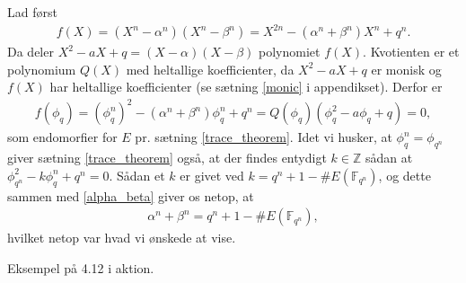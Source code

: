 \begin{proofof}
Lad først
\begin{align*}
	f(X) = (X^n - \alpha^n)(X^n - \beta^n) = X^{2n} - (\alpha^n + \beta^n)X^n + q^n.
\end{align*}
Da deler $X^2 - aX + q = (X- \alpha)(X-\beta)$ polynomiet $f(X)$. Kvotienten er et polynomium $Q(X)$ med heltallige koefficienter, da $X^2 - aX + q$ er monisk og $f(X)$ har heltallige koefficienter (se sætning \ref{monic} i appendikset). Derfor er
\begin{align}
	\label{alpha_beta}
	f(\phi_q) = (\phi_{q}^{n})^2 - (\alpha^n + \beta^n) \phi_{q}^{n} + q^n
	= Q(\phi_q)(\phi_{q}^{2} - a \phi_q + q) = 0,
\end{align}
som endomorfier for $E$ pr. sætning \ref{trace_theorem}. Idet vi husker, at $\phi_{q}^{n} = \phi_{q^n}$ giver sætning \ref{trace_theorem} også, at der findes entydigt $k \in \mathbb{Z}$ sådan at $\phi_{q^n}^{2} - k \phi_{q}^{n} + q^n = 0$. Sådan et $k$ er givet ved $k=q^n + 1 - \#E(\mathbb{F}_{q^n})$, og dette sammen med \eqref{alpha_beta} giver os netop, at
\begin{align*}
	\alpha^n + \beta^n = q^n + 1 - \#E(\mathbb{F}_{q^n}),
\end{align*}
hvilket netop var hvad  vi ønskede at vise.
\end{proofof}

\begin{example}
Eksempel på 4.12 i aktion.
\end{example}




